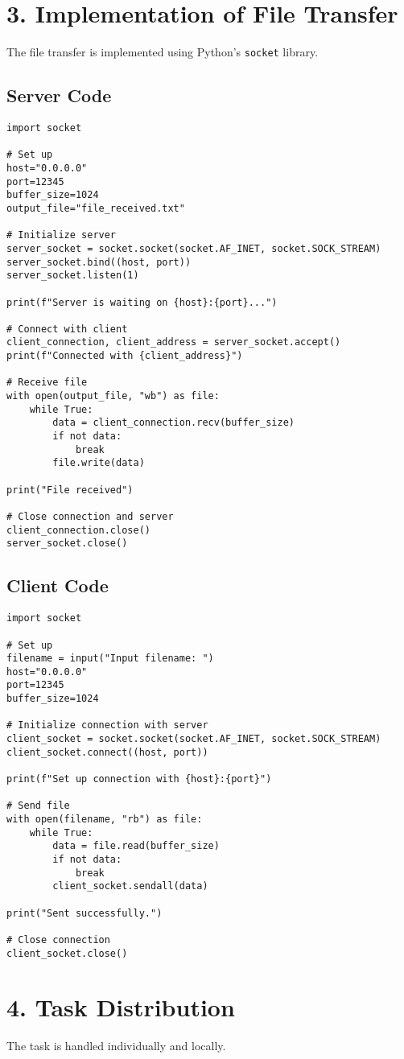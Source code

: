 \documentclass[12pt]{article}
\begin{document}
\section*{3. Implementation of File Transfer}

The file transfer is implemented using Python's \texttt{socket} library. 

\subsection*{Server Code}
\begin{lstlisting}
import socket

# Set up
host="0.0.0.0"
port=12345
buffer_size=1024
output_file="file_received.txt"

# Initialize server
server_socket = socket.socket(socket.AF_INET, socket.SOCK_STREAM)
server_socket.bind((host, port))
server_socket.listen(1)

print(f"Server is waiting on {host}:{port}...")

# Connect with client
client_connection, client_address = server_socket.accept()
print(f"Connected with {client_address}")

# Receive file
with open(output_file, "wb") as file:
    while True:
        data = client_connection.recv(buffer_size)
        if not data:
            break
        file.write(data)

print("File received")

# Close connection and server
client_connection.close()
server_socket.close()
\end{lstlisting}

\subsection*{Client Code}
\begin{lstlisting}
import socket

# Set up
filename = input("Input filename: ")
host="0.0.0.0"
port=12345
buffer_size=1024

# Initialize connection with server
client_socket = socket.socket(socket.AF_INET, socket.SOCK_STREAM)
client_socket.connect((host, port))

print(f"Set up connection with {host}:{port}")

# Send file
with open(filename, "rb") as file:
    while True:
        data = file.read(buffer_size)
        if not data:
            break
        client_socket.sendall(data)

print("Sent successfully.")

# Close connection
client_socket.close()
\end{lstlisting}

\section*{4. Task Distribution}

The task is handled individually and locally.
\end{document}
